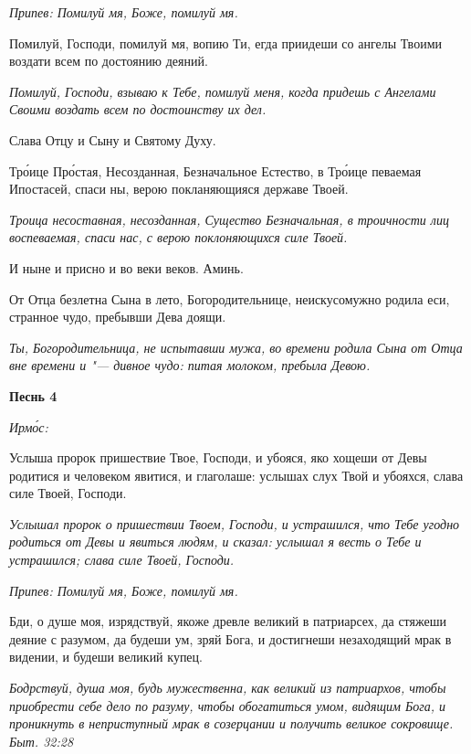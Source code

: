 \itshape Припев:\normalfont{} Помилуй мя, Боже, помилуй мя.


Помилуй, Господи, помилуй мя, вопию Ти, егда приидеши со ангелы Твоими воздати всем по достоянию деяний.


\itshape Помилуй, Господи, взываю к Тебе, помилуй меня, когда придешь с Ангелами Своими воздать всем по достоинству их дел.\normalfont{}


Слава Отцу и Сыну и Святому Духу.


Тро́ице Про́стая, Несозданная, Безначальное Естество, в Тро́ице певаемая Ипостасей, спаси ны, верою покланяющияся державе Твоей.


\itshape Троица несоставная, несозданная, Существо Безначальная, в троичности лиц воспеваемая, спаси нас, с верою поклоняющихся силе Твоей.\normalfont{}


И ныне и присно и во веки веков. Аминь.


От Отца безлетна Сына в лето, Богородительнице, неискусомужно родила еси, странное чудо, пребывши Дева доящи.


\itshape Ты, Богородительница, не испытавши мужа, во времени родила Сына от Отца вне времени и "--- дивное чудо: питая молоком, пребыла Девою.\normalfont{}





\bfseries Песнь 4\normalfont{}


\itshape Ирмо́с:\normalfont{}


Услыша пророк пришествие Твое, Господи, и убояся, яко хощеши от Девы родитися и человеком явитися, и глаголаше: услышах слух Твой и убояхся, слава силе Твоей, Господи.


\itshape Услышал пророк о пришествии Твоем, Господи, и устрашился, что Тебе угодно родиться от Девы и явиться людям, и сказал: услышал я весть о Тебе и устрашился; слава силе Твоей, Господи.\normalfont{}


\itshape Припев:\normalfont{} Помилуй мя, Боже, помилуй мя.


Бди, о душе моя, изрядствуй, якоже древле великий в патриарсех, да стяжеши деяние с разумом, да будеши ум, зряй Бога, и достигнеши незаходящий мрак в видении, и будеши великий купец.


\itshape Бодрствуй, душа моя, будь мужественна, как великий из патриархов, чтобы приобрести себе дело по разуму, чтобы обогатиться умом, видящим Бога, и проникнуть в неприступный мрак в созерцании и получить великое сокровище. Быт. 32:28\normalfont{}


